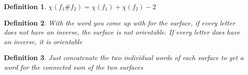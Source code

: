 \documentclass[executivepaper]{article}
\newtheorem{definition}{Definition}
\begin{document}
\vspace{2mm}

\begin{tcolorbox}

\begin{definition}

\textit{$\chi(f_{1}\texttt{\#}f_{2})=\chi(f_{1}) + \chi(f_{2}) - 2$}

\end{definition}

\end{tcolorbox}

\vspace{2mm}

\begin{tcolorbox}

\begin{definition}

\textit{With the word you come up with for the surface, if every letter does not have an inverse, the surface is not orientable. If every letter does have an inverse, it is orientable}

\end{definition}

\end{tcolorbox}

\vspace{2mm}

\begin{tcolorbox}

\begin{definition}

\textit{Just concatenate the two individual words of each surface to get a word for the connected sum of the two surfaces}

\end{definition}

\end{tcolorbox}

\pagebreak

\vspace*{-30mm}
\end{document}
